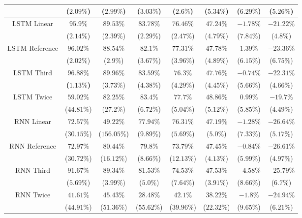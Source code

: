\begin{table}[!ht]
{\begin{tabular}{|c|c|c|c|c|c|c|c|}
			 & ($2.09\%$) & ($2.99\%$) & ($3.03\%$) & ($2.6\%$) & ($5.34\%$) & ($6.29\%$) & ($5.26\%$) \\ \hline
			\multirow{2}{*}{LSTM Linear} & $95.9\%$ & $89.53\%$ & $83.78\%$ & $76.46\%$ & $47.24\%$ & $-1.78\%$ & $-21.22\%$ \\
			 & ($2.14\%$) & ($2.39\%$) & ($2.29\%$) & ($2.47\%$) & ($4.79\%$) & ($7.84\%$) & ($4.8\%$) \\ \hline
			\multirow{2}{*}{LSTM Reference} & $96.02\%$ & $88.54\%$ & $82.1\%$ & $77.31\%$ & $47.78\%$ & $1.39\%$ & $-23.36\%$ \\
			 & ($2.02\%$) & ($2.9\%$) & ($3.67\%$) & ($3.96\%$) & ($4.89\%$) & ($6.15\%$) & ($6.75\%$) \\ \hline
			\multirow{2}{*}{LSTM Third} & $\mathbf{96.88\%}$ & $89.96\%$ & $83.59\%$ & $76.3\%$ & $47.76\%$ & $-0.74\%$ & $-22.31\%$ \\
			 & \textbf{(}$\mathbf{1.13\%}$\textbf{)} & ($3.73\%$) & ($4.38\%$) & ($4.29\%$) & ($4.45\%$) & ($5.66\%$) & ($4.66\%$) \\ \hline
			\multirow{2}{*}{LSTM Twice} & $59.02\%$ & $82.25\%$ & $83.4\%$ & $77.7\%$ & $48.86\%$ & $0.99\%$ & $-19.7\%$ \\
			 & ($44.81\%$) & ($27.2\%$) & ($6.72\%$) & ($5.04\%$) & ($5.12\%$) & ($5.85\%$) & ($4.49\%$) \\ \hline
			\multirow{2}{*}{RNN Linear} & $72.57\%$ & $49.22\%$ & $77.94\%$ & $76.31\%$ & $47.19\%$ & $-1.28\%$ & $-26.64\%$ \\
			 & ($30.15\%$) & ($156.05\%$) & ($9.89\%$) & ($5.69\%$) & ($5.0\%$) & ($7.33\%$) & ($5.17\%$) \\ \hline
			\multirow{2}{*}{RNN Reference} & $72.97\%$ & $80.44\%$ & $79.8\%$ & $73.79\%$ & $47.45\%$ & $-0.84\%$ & $-26.61\%$ \\
			 & ($30.72\%$) & ($16.12\%$) & ($8.66\%$) & ($12.13\%$) & ($4.13\%$) & ($5.99\%$) & ($4.97\%$) \\ \hline
			\multirow{2}{*}{RNN Third} & $91.67\%$ & $89.34\%$ & $81.53\%$ & $74.53\%$ & $47.53\%$ & $-4.58\%$ & $-25.79\%$ \\
			 & ($5.69\%$) & ($3.99\%$) & ($5.0\%$) & ($7.64\%$) & ($3.91\%$) & ($8.66\%$) & ($6.7\%$) \\ \hline
			\multirow{2}{*}{RNN Twice} & $41.61\%$ & $45.43\%$ & $28.48\%$ & $42.1\%$ & $38.22\%$ & $-1.8\%$ & $-24.94\%$ \\
			 & ($44.91\%$) & ($51.36\%$) & ($55.62\%$) & ($39.96\%$) & ($22.32\%$) & ($9.65\%$) & ($6.21\%$) \\ \hline

\end{tabular}}
\end{table}
